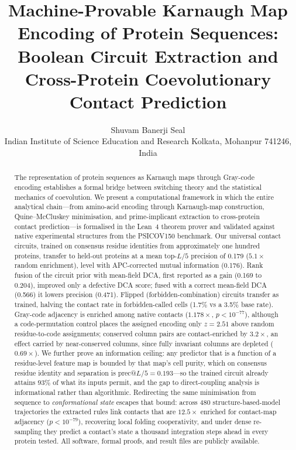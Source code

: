 \documentclass[11pt,a4paper]{article}
\begin{document}
\title{Machine-Provable Karnaugh Map Encoding of Protein Sequences:\\
	Boolean Circuit Extraction and Cross-Protein Coevolutionary\\
	Contact Prediction}

\author{Shuvam Banerji Seal\\
	\small Indian Institute of Science Education and Research Kolkata, Mohanpur 741246, India}

\date{}

\maketitle

\begin{abstract}
	The representation of protein sequences as Karnaugh maps through Gray-code
	encoding establishes a formal bridge between switching theory and the
	statistical mechanics of coevolution.  We present a computational framework in
	which the entire analytical chain---from amino-acid encoding through
	Karnaugh-map construction, Quine--McCluskey minimisation, and prime-implicant
	extraction to cross-protein contact prediction---is formalised in the Lean~4
	theorem prover and validated against native experimental structures from the
	PSICOV150 benchmark.  Our universal contact circuits, trained on consensus
	residue identities from approximately one hundred proteins, transfer to
	held-out proteins at a mean top-$L/5$ precision of 0.179 ($5.1\times$ random
	enrichment), level with APC-corrected mutual information (0.176).  Rank fusion of the circuit prior with mean-field DCA, first reported
	as a gain (0.169 to 0.204), improved only a defective DCA score; fused with
	a correct mean-field DCA (0.566) it lowers precision (0.471).  Flipped (forbidden-combination) circuits
	transfer as trained, halving the contact rate in forbidden-called cells (1.7\% vs a 3.5\% base rate).  Gray-code adjacency is
	enriched among native contacts ($1.178\times$, $p < 10^{-77}$), although a
	code-permutation control places the assigned encoding only $z = 2.51$ above
	random residue-to-code assignments; conserved column pairs are
	contact-enriched by $3.2\times$, an effect carried by near-conserved
	columns, since fully invariant columns are depleted ($0.69\times$).  We further prove an
	information ceiling: any predictor that is a function of a residue-level
	feature map is bounded by that map's cell purity, which on consensus residue
	identity and separation is prec@$L/5 = 0.193$---so the trained circuit already
	attains $93\%$ of what its inputs permit, and the gap to direct-coupling
	analysis is informational rather than algorithmic.  Redirecting the same
	minimisation from sequence to \emph{conformational state} escapes that bound:
	across 480 structure-based-model trajectories the extracted rules link
	contacts that are $12.5\times$ enriched for contact-map adjacency
	($p < 10^{-79}$), recovering local folding cooperativity, and under dense
	re-sampling they predict a contact's state a thousand integration steps ahead
	in every protein tested.  All software, formal
	proofs, and result files are publicly available.
\end{abstract}
\end{document}
